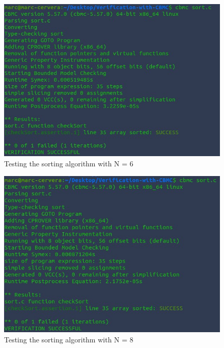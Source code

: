 \documentclass[a4paper,12pt]{article}
\begin{document}
\begin{figure}[H]
    \centering
    \includegraphics{images/testN6.jpg}
    \caption{Testing the sorting algorithm with N = 6}
    \label{fig:bubble6}
\end{figure}


\begin{figure}[H]
    \centering
    \includegraphics{images/testN8.jpg}
    \caption{Testing the sorting algorithm with N = 8}
    \label{fig:bubble8}
\end{figure}

\end{document}
